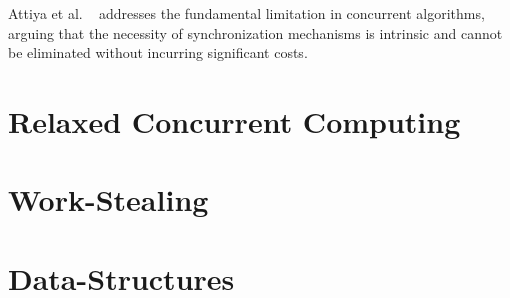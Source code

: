 Attiya et al. ~\cite{DBLP_conf_popl_AttiyaGHKMV11} addresses the fundamental limitation in concurrent algorithms, arguing that the necessity of synchronization mechanisms is intrinsic and cannot be eliminated without incurring significant costs. 


\section{\label{section:relaxed-concurrent}Relaxed Concurrent Computing}
\section{\label{section:work-stealing}Work-Stealing}
\section{\label{section:data-structures}Data-Structures}


